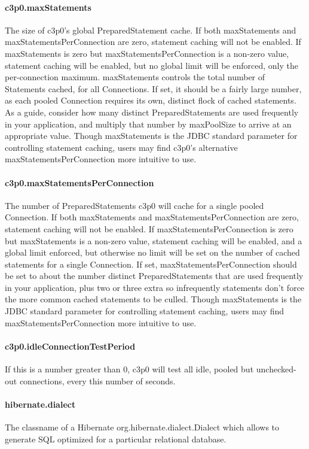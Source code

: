\documentclass[12pt,a4paper]{report}
\begin{document}
\paragraph{c3p0.maxStatements}
The size of c3p0's global PreparedStatement cache. If both maxStatements and maxStatementsPerConnection are zero, statement caching will not be enabled. If maxStatements is zero but maxStatementsPerConnection is a non-zero value, statement caching will be enabled, but no global limit will be enforced, only the per-connection maximum. maxStatements controls the total number of Statements cached, for all Connections. If set, it should be a fairly large number, as each pooled Connection requires its own, distinct flock of cached statements. As a guide, consider how many distinct PreparedStatements are used frequently in your application, and multiply that number by maxPoolSize to arrive at an appropriate value. Though maxStatements is the JDBC standard parameter for controlling statement caching, users may find c3p0's alternative maxStatementsPerConnection more intuitive to use. 

\paragraph{c3p0.maxStatementsPerConnection}
The number of PreparedStatements c3p0 will cache for a single pooled Connection. If both maxStatements and maxStatementsPerConnection are zero, statement caching will not be enabled. If maxStatementsPerConnection is zero but maxStatements is a non-zero value, statement caching will be enabled, and a global limit enforced, but otherwise no limit will be set on the number of cached statements for a single Connection. If set, maxStatementsPerConnection should be set to about the number distinct PreparedStatements that are used frequently in your application, plus two or three extra so infrequently statements don't force the more common cached statements to be culled. Though maxStatements is the JDBC standard parameter for controlling statement caching, users may find maxStatementsPerConnection more intuitive to use.

\paragraph{c3p0.idleConnectionTestPeriod}
If this is a number greater than 0, c3p0 will test all idle, pooled but unchecked-out connections, every this number of seconds.

\paragraph{hibernate.dialect}
The classname of a Hibernate org.hibernate.dialect.Dialect which allows to generate SQL optimized for a particular relational database.
\end{document}
